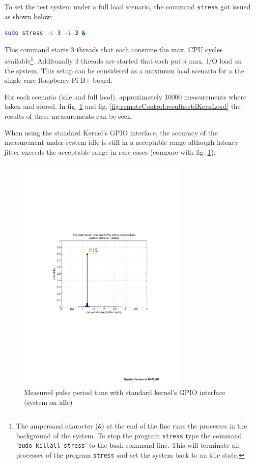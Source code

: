 To set the test system under a full load scenario, the command \texttt{stress} got issued as shown below:
\begin{lstlisting}[language=bash,otherkeywords={sudo,tar,touch,gedit,cp,apt-get,mkdir}]
sudo stress -c 3 -i 3 &
\end{lstlisting}
This command starts 3 threads that each consume the max. CPU cycles available\footnote{The ampersand character (\texttt{\&}) at the end of the line runs the processes in the background of the system. To stop the program \texttt{stress} type the command '\texttt{sudo killall stress}' to the bash command line. This will terminate all processes of the program \texttt{stress} and set the system back to an idle state.}. Additonally 3 threads are started that each put a max. I/O load on the system. This setup can be considered as a maximum load scenario for a the single core Raspberry Pi B+ board.

For each scenario (idle and full load), approximately 10000 measurements where taken and stored. In fig. \ref{fig:remoteControl:results:stdKernIdle} and fig. \ref{fig:remoteControl:results:stdKernLoad} the results of these measurements can be seen.

When using the standard Kernel's GPIO interface, the accuracy of the measurement under system idle is still in a acceptable range although latency jitter exceeds the acceptable range in rare cases (compare with fig. \ref{fig:remoteControl:results:stdKernIdle}).

\begin{figure}[H]
    \centering
    \includegraphics[width=0.75\textwidth]{fig/ch-ppm-kernel-driver/stdKern_woLoad}
    \caption[Measured pulse period time with standard kernel (system on idle)]{Measured pulse period time with standard kernel's GPIO interface \\(system on idle)}
    \label{fig:remoteControl:results:stdKernIdle}
\end{figure}

